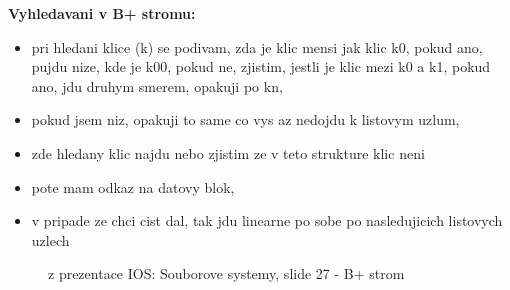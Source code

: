 \documentclass[a4paper, 11pt]{article}
\begin{document}
\textbf{Vyhledavani v B+ stromu:}
\begin{itemize}
    \item pri hledani klice (k) se podivam, zda je klic mensi jak klic k0, pokud ano, pujdu nize, kde je k00, pokud ne, zjistim, jestli je klic mezi k0 a k1, pokud ano, jdu druhym smerem, opakuji po kn,
    \item pokud jsem niz, opakuji to same co vys az nedojdu k listovym uzlum,
    \item zde hledany klic najdu nebo zjistim ze v teto strukture klic neni
    \item pote mam odkaz na datovy blok,
    \item v pripade ze chci cist dal, tak jdu linearne po sobe po nasledujicich listovych uzlech \\
\end{itemize}

\begin{figure}[htb]
    \centering
    \caption{z prezentace IOS: Souborove systemy, slide 27 - B+ strom}
\end{figure}

\newpage
\end{document}
